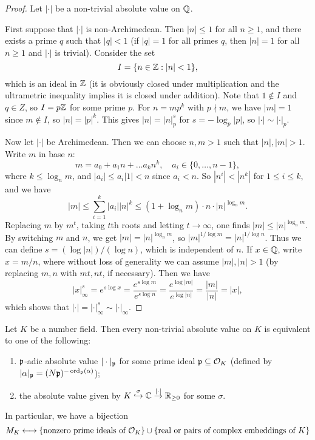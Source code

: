 \begin{proof}
  Let $|\cdot|$ be a non-trivial absolute value on $\mathbb{Q}$.

  First suppose that $|\cdot|$ is non-Archimedean.
  Then $|n| \le 1$ for all $n \ge 1$, and there
  exists a prime $q$ such that $|q| < 1$ (if $|q| = 1$ for
  all primes $q$,
  then $|n| = 1$ for all $n \ge 1$ and $|\cdot|$ is
  trivial). Consider the set
  \[
    I = \{n \in \mathbb{Z} : |n| < 1\},
  \]
  which is an ideal in $\mathbb{Z}$ (it is obviously closed
  under multiplication and the ultrametric inequality
  implies it is closed under addition). Note that
  $1 \notin I$ and $q \in Z$, so $I = p\mathbb{Z}$ for some prime $p$.
  For $n = mp^k$ with $p \nmid m$, we have
  $|m| = 1$ since $m \notin I$, so $|n| = |p|^k$.
  This gives $|n| = |n|_p^s$ for
  $s = -\log_p |p|$, so $|\cdot| \sim |\cdot|_p$.

  Now let $|\cdot|$ be Archimedean. Then we can
  choose $n, m > 1$ such that $|n|, |m| > 1$. Write $m$
  in base $n$:
  \[
    m = a_0 + a_1 n + \dots a_k n^k, \quad a_i \in \{0, \dots, n - 1\},
  \]
  where $k \le \log_n m$, and $|a_i| \le a_i |1| < n$
  since $a_i < n$. So $|n^i| < |n^k|$ for $1 \le i \le k$, and we have
  \[
    |m| \le \sum_{i = 1}^k |a_i| |n|^k
    \le (1 + \log_n m) \cdot n \cdot |n|^{\log_n m}.
  \]
  Replacing $m$ by $m^t$, taking $t$th roots and
  letting $t \to \infty$, one finds
  $|m| \le |n|^{\log_n m}$. By switching $m$ and $n$,
  we get $|m| = |n|^{\log_n m}$, so
  $|m|^{1 / \log m} = |n|^{1 / \log n}$. Thus we can
  define $s = (\log |n|) / (\log n)$, which is
  independent of $n$. If $x \in \mathbb{Q}$, write
  $x = m / n$, where without loss of generality
  we can assume $|m|, |n| > 1$ (by replacing
  $m, n$ with $mt, nt$, if necessary). Then we have
  \[
    |x|_{\infty}^s = e^{s \log x}
    = \frac{e^{s \log m}}{e^{s \log n}}
    = \frac{e^{\log |m|}}{e^{\log |n|}}
    = \frac{|m|}{|n|} = |x|,
  \]
  which shows that $|\cdot| = |\cdot|_{\infty}^s \sim |\cdot|_\infty$.
\end{proof}

\begin{theorem}
  Let $K$ be a number field. Then every non-trivial
  absolute value on $K$ is equivalent to one of the
  following:
  \begin{enumerate}
    \item $\mathfrak{p}$-adic absolute value
      $|\cdot|_{\mathfrak{p}}$ for some prime ideal
      $\mathfrak{p} \subseteq \mathcal{O}_K$ (defined by
      $|\alpha|_{\mathfrak{p}} = (N \mathfrak{p})^{-\operatorname{ord}_{\mathfrak{p}}(\alpha)}$);
    \item the absolute value given by
      $K \overset{\sigma}{\hookrightarrow} \mathbb{C} \overset{|\cdot|}{\to} \mathbb{R}_{\ge 0}$
      for some $\sigma$.
  \end{enumerate}
  In particular, we have a bijection
  \[M_K \longleftrightarrow \{\text{nonzero prime ideals of $\mathcal{O}_K$}\} \cup \{\text{real or pairs of complex embeddings of $K$}\}\]
\end{theorem}

